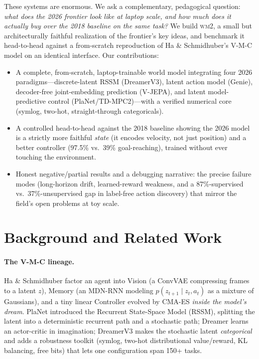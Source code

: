 \documentclass[11pt]{article}
\newcommand{\wmtwo}{\textsc{wm2}}
\begin{document}
These systems are enormous. We ask a complementary, pedagogical question:
\emph{what does the 2026 frontier look like at laptop scale, and how much does it
actually buy over the 2018 baseline on the same task?} We build \wmtwo, a small but
architecturally faithful realization of the frontier's key ideas, and benchmark it
head-to-head against a from-scratch reproduction of Ha \& Schmidhuber's V-M-C model
on an identical interface. Our contributions:
\begin{itemize}\itemsep2pt
  \item A complete, from-scratch, laptop-trainable world model integrating four
  2026 paradigms---discrete-latent RSSM (DreamerV3), latent action model (Genie),
  decoder-free joint-embedding prediction (V-JEPA), and latent model-predictive
  control (PlaNet/TD-MPC2)---with a verified numerical core (symlog, two-hot,
  straight-through categoricals).
  \item A controlled head-to-head against the 2018 baseline showing the 2026 model
  is a strictly more faithful \emph{state} (it encodes velocity, not just position)
  and a better controller (97.5\% vs.\ 39\% goal-reaching), trained without ever
  touching the environment.
  \item Honest negative/partial results and a debugging narrative: the precise
  failure modes (long-horizon drift, learned-reward weakness, and a 87\%-supervised
  vs.\ 37\%-unsupervised gap in label-free action discovery) that mirror the field's
  open problems at toy scale.
\end{itemize}

\section{Background and Related Work}
\paragraph{The V-M-C lineage.} Ha \& Schmidhuber \cite{ha2018world} factor an agent
into Vision (a ConvVAE compressing frames to a latent $z$), Memory (an MDN-RNN
modeling $p(z_{t+1}\mid z_t,a_t)$ as a mixture of Gaussians), and a tiny linear
Controller evolved by CMA-ES \emph{inside the model's dream}. PlaNet introduced the
Recurrent State-Space Model (RSSM), splitting the latent into a deterministic
recurrent path and a stochastic path; Dreamer \cite{hafner2020dream} learns an
actor-critic in imagination; DreamerV3 \cite{hafner2025dreamerv3} makes the
stochastic latent \emph{categorical} and adds a robustness toolkit (symlog, two-hot
distributional value/reward, KL balancing, free bits) that lets one configuration
span 150+ tasks.
\end{document}
